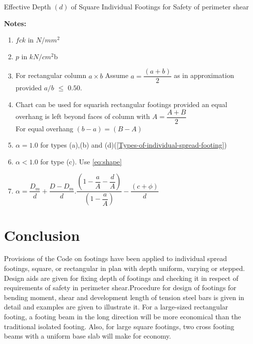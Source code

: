 \begin{chart}                                                             \begin{center}                                                     
\end{center}                                                       \caption{Effective Depth $(d)$ of Square Individual Footings for Safety of perimeter shear}  
\label{Dummy chart}    
\end{chart}    

\textbf{Notes:}
\begin{enumerate}
\item  $fck$ in $N/mm^2$
\item $p$ in $kN/cm^2$b
\item For rectangular column $a\times b$
Assume $a=\dfrac{(a+b)}{2}$ as in approximation provided $a/b$ $\leq$ $0.50.$
\item Chart can be used for squarish rectangular footings provided an equal overhang is left beyond faces of column with $A=\dfrac{A+B}{2}$\\
For equal overhang $(b-a)=(B-A)$
\item $\alpha=1.0$ for types (a),(b) and (d)(\figmacro \ref{Types-of-individual-spread-footing})
\item $\alpha<1.0$ for type (c). Use \equmacro \ref{eq:shape}
\item $\alpha=\dfrac{D_m}{d}+\dfrac{D-D_m}{d}.\dfrac{\left(1-\dfrac{a}{A}-\dfrac{d}{A}\right)}{\left(1-\dfrac{a}{A}\right)}-\dfrac{(c+\phi)}{d}$
\end{enumerate}

\section{Conclusion}
Provisions of the Code on footings have been applied to individual spread footings, square, or rectangular in plan with depth uniform, varying or stepped. Design aids are given for  fixing depth of footings and checking it in respect of requirements of safety in perimeter shear.Procedure for design of footings for bending moment, shear and development length of tension steel bars is given in detail and examples are given to illustrate it. For a large-sized rectangular footing, a footing beam in the long direction will be more economical than the traditional isolated footing. Also, for large square footings, two cross footing beams with a uniform base slab will make for economy.


